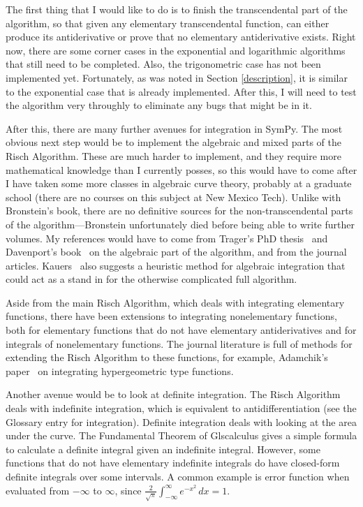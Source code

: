 The first thing that I would like to do is to finish the
\gls{transcendental} part of the algorithm, so that given any
\gls{elementary} \gls{transcendental} function, \rischintegrate{} can
either produce its antiderivative or prove that no \gls{elementary}
antiderivative exists.  Right now, there are some corner cases in the
exponential and logarithmic algorithms that still need to be completed. 
Also, the trigonometric case has not been implemented yet.  Fortunately,
as was noted in Section \ref{description}, it is similar to the
exponential case that is already implemented.  After this, I will need
to test the algorithm very throughly to eliminate any bugs that might be
in it.

After this, there are many further avenues for \gls{integration} in
SymPy.  The most obvious next step would be to implement the \gls{algebraic}
and mixed parts of the Risch Algorithm.  These are much harder to
implement, and they require more mathematical knowledge than I currently
posses, so this would have to come after I have taken some more classes
in \gls{algebraic} curve theory, probably at a graduate school (there are no
courses on this subject at New Mexico Tech).  Unlike with Bronstein's
book, there are no definitive sources for the non-\gls{transcendental}
parts of the algorithm---Bronstein unfortunately died before being able
to write further volumes.  My references would have to come
from Trager's PhD thesis~\cite{trager1984integration} and Davenport's
book~\cite{davenport1984integration} on the \gls{algebraic} part of the
algorithm, and from the journal articles.  Kauers~\cite{kauers2008integration} also suggests a heuristic method for
\gls{algebraic} \gls{integration} that could act as a stand in for the
otherwise complicated full algorithm.

Aside from the main Risch Algorithm, which deals with integrating
\gls{elementary} functions, there have been extensions to integrating
nonelementary functions, both for \gls{elementary} functions that do not
have \gls{elementary} antiderivatives and for integrals of nonelementary
functions.  The journal literature is full of methods for extending the
Risch Algorithm to these functions, for example, Adamchik's paper~\cite{adamchik1990hypergeometric} on integrating hypergeometric type
functions.

Another avenue would be to look at definite \gls{integration}.  The
Risch Algorithm deals with indefinite \gls{integration}, which is
equivalent to antidifferentiation (see the Glossary entry for
\gls{integration}).  Definite \gls{integration} deals with looking at
the area under the curve.  The Fundamental Theorem of Gls{calculus} gives a
simple formula to calculate a definite integral given an indefinite
integral.  However, some functions that do not have \gls{elementary}
indefinite integrals do have closed-form definite integrals over some
intervals.  A common example is \gls{error function} when evaluated from
$-\infty$ to $\infty$, since
$\frac{2}{\sqrt{\pi}}\int_{-\infty}^\infty{e^{-x^2}\,dx}=1$.

